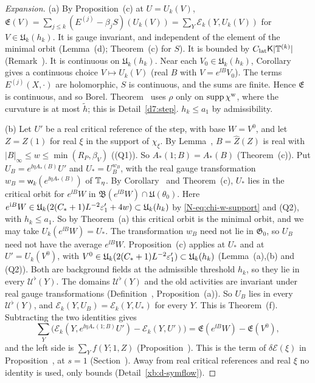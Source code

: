 \begin{proof}[Expansion]
(a) By Proposition~(c) at $U=U_k(V)$, $\mathfrak E(V)=\sum_{j\le k}(E^{(j)}-\beta_jS)(U_k(V))=\sum_Y\mathcal E_k(Y,U_k(V))$ for $V\in\mathfrak U_k(h_k)$. It is gauge invariant, and independent of the element of the minimal orbit (Lemma~(d); Theorem~(c) for $S$). It is bounded by $C_{\rm lat}\mathsf K|\mathbb T^{(k)}|$ (Remark~). It is continuous on $\mathfrak U_k(h_k)$. Near each $V_0\in\mathfrak U_k(h_k)$, Corollary~ gives a continuous choice $V\mapsto U_k(V)$ (real $B$ with $V=e^{\ii B}V_0$). The terms $E^{(j)}(X,\cdot)$ are holomorphic, $S$ is continuous, and the sums are finite. Hence $\mathfrak E$ is continuous, and so Borel. Theorem~ uses $\rho$ only on $\operatorname{supp}\chi^{\rm w}$, where the curvature is at most $\tilde h$; this is Detail~\ref{d7:step}. $h_k\le a_1$ by admissibility.

(b) Let $U'$ be a real critical reference of the step, with base $W=V^0$, and let $Z=Z(1)$ for real $\xi$ in the support of $\chi_\xi$. By Lemma~, $B=\hat Z(Z)$ is real with $|B|_\infty\le w\le\min(R_P,\beta_V)$ ((Q1)). So $A_*(1;B)=A_*(B)$ (Theorem~(c)). Put $U_B=e^{\ii\eta A_*(B)}U'$ and $U_*=U_B^{w_B}$, with the real gauge transformation $w_B=\mathsf w_k(e^{\ii\eta A_*(B)})$ of $\mathbb T_\eta$. By Corollary~ and Theorem~(c), $U_*$ lies in the critical orbit for $e^{\ii B}W$ in $\mathfrak B(e^{\ii B}W)\cap\mathfrak U(\theta_0)$. Here $e^{\mathrm i B}W\in\mathfrak U_k(2(C_*+1)L^{-2}\varepsilon'_1+4w)\subset\mathfrak U_k(h_k)$ by \eqref{N-eq:chi-w-support} and (Q2), with $h_k\le a_1$. So by Theorem~(a) this critical orbit is the minimal orbit, and we may take $U_k(e^{\ii B}W)=U_*$. The transformation $w_B$ need not lie in $\mathfrak G_0$, so $U_B$ need not have the average $e^{\ii B}W$. Proposition~(c) applies at $U_*$ and at $U'=U_k(V^0)$, with $V^0\in\mathfrak U_k(2(C_*+1)L^{-2}\varepsilon'_1)\subset\mathfrak U_k(h_k)$ (Lemma~(a),(b) and (Q2)). Both are background fields at the admissible threshold $h_k$, so they lie in every $\mathcal U^\flat(Y)$. The domains $\mathcal U^\flat(Y)$ and the old activities are invariant under real gauge transformations (Definition~, Proposition~(a)). So $U_B$ lies in every $\mathcal U^\flat(Y)$, and $\mathcal E_k(Y,U_B)=\mathcal E_k(Y,U_*)$ for every $Y$. This is Theorem~(f). Subtracting the two identities gives
\[
\sum_Y\big(\mathcal E_k(Y,e^{\ii\eta A_*(1;B)}U')-\mathcal E_k(Y,U')\big)=\mathfrak E(e^{\ii B}W)-\mathfrak E(V^0),
\]
and the left side is $\sum_Yf(Y;1,Z)$ (Proposition~). This is the term of $\delta\mathcal E(\xi)$ in Proposition~, at $s=1$ (Section~). Away from real critical references and real $\xi$ no identity is used, only bounds (Detail~\ref{xb:d-symflow}).


\end{proof}
